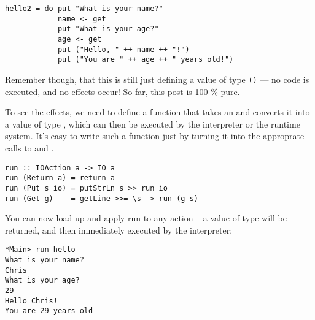 \documentclass[thesis-solanki.tex]{subfiles}
\begin{document}
\begin{code-list}[H]
\begin{singlespace}
\begin{verbatim}
hello2 = do put "What is your name?"
            name <- get
            put "What is your age?"
            age <- get
            put ("Hello, " ++ name ++ "!")
            put ("You are " ++ age ++ " years old!")
\end{verbatim}
\end{singlespace}
\caption{}
\label{}
\end{code-list}


Remember though, that this is still just defining a value of type 
 \Verb!()! ---
no code is executed, and no effects occur! So far, this post is 100 \% pure.

To see the effects, we need to define a function that takes an   and converts it into a value of type  , which can then be executed by the interpreter or the runtime system. It's easy to write such a function just by turning it into the approprate calls to  and .


\begin{code-list}[H]
\begin{singlespace}
\begin{verbatim}
run :: IOAction a -> IO a
run (Return a) = return a
run (Put s io) = putStrLn s >> run io
run (Get g)    = getLine >>= \s -> run (g s)
\end{verbatim}
\end{singlespace}
\caption{}
\label{}
\end{code-list}



You can now load up  and apply run to any action --
a value of type   will be returned, and then immediately executed by the 
interpreter:


\begin{code-list}[H]
\begin{singlespace}
\begin{verbatim}
*Main> run hello
What is your name?
Chris
What is your age?
29
Hello Chris!
You are 29 years old
\end{verbatim}
\end{singlespace}
\caption{}
\label{}
\end{code-list}
\end{document}

